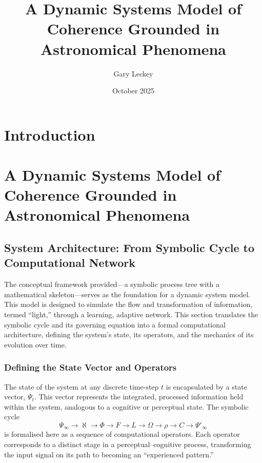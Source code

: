 \documentclass{article}
\title{A Dynamic Systems Model of Coherence Grounded in Astronomical Phenomena}
\author{Gary Leckey}
\date{October 2025}
\begin{document}
\maketitle

\section{Introduction}

\section{A Dynamic Systems Model of Coherence Grounded in Astronomical Phenomena}

\subsection{System Architecture: From Symbolic Cycle to Computational Network}

The conceptual framework provided---a symbolic process tree with a mathematical skeleton---serves as the foundation for a dynamic system model. This model is designed to simulate the flow and transformation of information, termed ``light,'' through a learning, adaptive network. This section translates the symbolic cycle and its governing equation into a formal computational architecture, defining the system's state, its operators, and the mechanics of its evolution over time.

\subsubsection{Defining the State Vector and Operators}

The state of the system at any discrete time-step $t$ is encapsulated by a state vector, $\Psi_t$. This vector represents the integrated, processed information held within the system, analogous to a cognitive or perceptual state. The symbolic cycle
\[
\Psi_\infty \rightarrow \aleph \rightarrow \Phi \rightarrow F \rightarrow L \rightarrow \Omega \rightarrow \rho \rightarrow C \rightarrow \Psi'_\infty
\]
is formalised here as a sequence of computational operators. Each operator corresponds to a distinct stage in a perceptual--cognitive process, transforming the input signal on its path to becoming an ``experienced pattern.''
\end{document}

